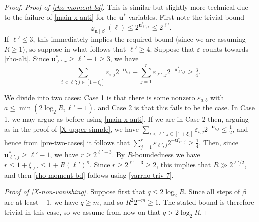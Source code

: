 \documentclass[11pt,reqno]{amsart}
\numberwithin{equation}{section}
\theoremstyle{definition}
\theoremstyle{remark}
\newcommand{\mbf}{\mathbf}
\newcommand{\eps}{\varepsilon}
\renewcommand{\le}{\leqslant}
\renewcommand{\ge}{\geqslant}
\begin{document}
\begin{proof}
\emph{Proof of \cref{rho-moment-bd}.} This is similar but slightly more technical due to the failure of \cref{main-x-anti} for the $\mbf{u}^*$ variables.  First note the trivial bound \begin{equation}\label{varrho-triv-7} \varrho_{\mbf{u} \mid \beta}(\ell) \le 2^{\mbf{u}^*_{\ell', r}} \le 2^{\ell'}.\end{equation} If $\ell' \le 3$, this immediately implies the required bound (since we are assuming $R \ge 1$), so suppose in what follows that $\ell' \ge 4$. 
Suppose that $\eps$ counts towards \cref{rho-alt}. Since $\mbf{u}^*_{\ell', r} \ge \ell' - 1 \ge 3$, we have
\begin{equation}\label{pre-two-cases}  \sum_{i < \ell'; j \in [1 + \xi_i]} \eps_{i,j} 2^{-\mbf{u}_{i,j}}  + \sum_{j = 1}^r \eps_{\ell', j} 2^{-\mbf{u}^*_{\ell', j}} \ge \tfrac{3}{4} .\end{equation}


We divide into two cases: Case 1 is that there is some nonzero $\eps_{a,b}$ with $a \le \min(2 \log_2 R, \ell' - 1)$, and Case 2 is that this fails to be the case. In Case 1, we may argue as before using \cref{main-x-anti}. If we are in Case 2 then, arguing as in the proof of \cref{X-upper-simple}, we have $\sum_{i < \ell'; j \in [1 + \xi_i]} \eps_{i,j} 2^{-\mbf{u}_{i,j}} \le \frac{1}{2}$, and hence from \cref{pre-two-cases} it follows that $\sum_{j = 1}^r \eps_{\ell', j} 2^{-\mbf{u}^*_{\ell', j}} \ge \frac{1}{4}$.  Then, since $\mbf{u}_{\ell', j}^* \ge \ell'-1$, we have $r \ge 2^{\ell' - 3}$. By $R$-boundedness we have $r \le 1+\xi_{\ell'} \le 1+R(\ell')^{\kappa}$. Since $r \ge 2^{\ell' - 3} \ge 2$, this implies that $R \gg 2^{\ell'/2}$, and then \cref{rho-moment-bd} follows using \cref{varrho-triv-7}.\vspace*{8pt}

\emph{Proof of \cref{X-non-vanishing}.} Suppose first that $q \le 2 \log_2 R$. Since all steps of $\beta$ are at least $-1$, we have $q \ge m$, and so $R^2 2^{-m} \ge 1$. The stated bound is therefore trivial in this case, so we assume from now on that $q > 2 \log_2 R$.



\end{proof}
\end{document}
